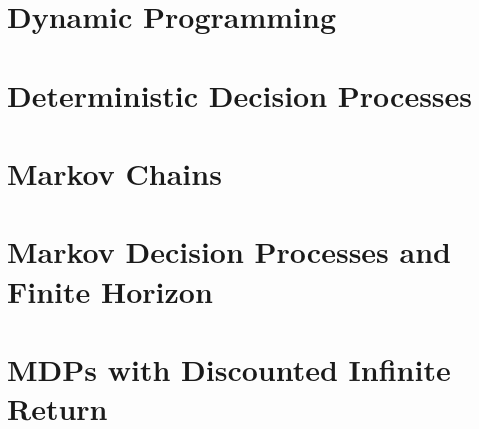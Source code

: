 \documentclass[12pt]{book}
\begin{document}
% 



% 


% 


\chapter{Dynamic Programming}
\label{chapter:dp}


\setcounter{chapter}{1}
\chapter{Deterministic Decision Processes}
\label{chapter:DDP}


\setcounter{chapter}{2}

\chapter{Markov Chains}
\label{chapter:MC}


\chapter{Markov Decision Processes and Finite Horizon}
\label{chapter:MDP-FH}



\chapter{MDPs with Discounted Infinite Return}
\label{chapter:disc}

% 
\end{document}
